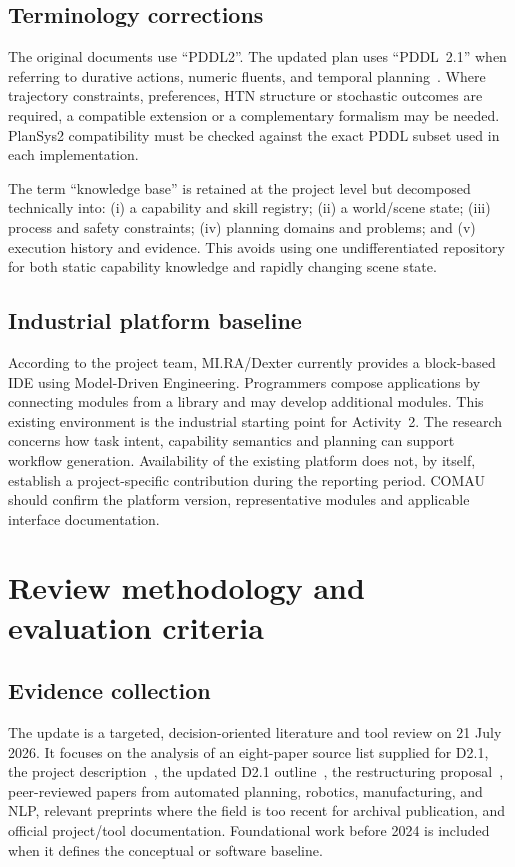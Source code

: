\documentclass{plan4ari_report}
\begin{document}
\subsection{Terminology corrections}
The original documents use ``PDDL2''. The updated plan uses ``PDDL~2.1'' when referring to durative actions, numeric fluents, and temporal planning~\cite{fox2003pddl21}. Where trajectory constraints, preferences, HTN structure or stochastic outcomes are required, a compatible extension or a complementary formalism may be needed. PlanSys2 compatibility must be checked against the exact PDDL subset used in each implementation.

The term ``knowledge base'' is retained at the project level but decomposed technically into: (i) a capability and skill registry; (ii) a world/scene state; (iii) process and safety constraints; (iv) planning domains and problems; and (v) execution history and evidence. This avoids using one undifferentiated repository for both static capability knowledge and rapidly changing scene state.

\subsection{Industrial platform baseline}
According to the project team, MI.RA/Dexter currently provides a block-based IDE using Model-Driven Engineering. Programmers compose applications by connecting modules from a library and may develop additional modules. This existing environment is the industrial starting point for Activity~2. The research concerns how task intent, capability semantics and planning can support workflow generation. Availability of the existing platform does not, by itself, establish a project-specific contribution during the reporting period. COMAU should confirm the platform version, representative modules and applicable interface documentation.

\section{Review methodology and evaluation criteria}\label{sec:method}

\subsection{Evidence collection}
The update is a targeted, decision-oriented literature and tool review on 21 July 2026. It focuses on the analysis of an eight-paper source list supplied for D2.1, the \PlanARI{} project description~\cite{plan4ari_pd}, the updated D2.1 outline~\cite{plan4ari_d21outline}, the restructuring proposal~\cite{sandrini2026proposal}, peer-reviewed papers from automated planning, robotics, manufacturing, and NLP, relevant preprints where the field is too recent for archival publication, and official project/tool documentation. Foundational work before 2024 is included when it defines the conceptual or software baseline.
\end{document}
